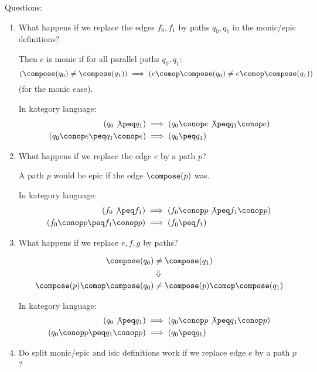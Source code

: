 \documentclass[11pt]{book}
\begin{document}
Questions:
\begin{enumerate}
  \item What happens if we replace the edges $f_0,f_1$
  by paths $q_0,q_1$ in the monic/epic definitions?
  
  Then $e$ is monic if for all parallel paths $q_0,q_1$:
  \[
  \left( \compose(q_0) \neq \compose(q_1) \right) 
  \implies 
  \left( e \comop \compose(q_0) \neq e \comop \compose(q_1) \right)
  \]
  (for the monic case).
  
  In kategory language:
  \begin{align*}
  \left( q_0 \not\peq q_1 \right) 
  & \implies 
  \left( q_0 \conop e \not\peq q_1 \conop e \right)
  \\
  \left( q_0 \conop e \peq q_1 \conop e \right)
  & \implies 
  \left( q_0 \peq q_1 \right) 
  \end{align*}

  \item What happens if we replace the edge $e$ by a path $p$?
  
  A path $p$ would be epic if the edge $\compose(p)$ was.
  
  In kategory language:
  \begin{align*}
  \left( f_0 \not\peq f_1 \right) 
  & \implies 
  \left( f_0 \conop p \not\peq f_1 \conop p \right)
  \\
  \left( f_0 \conop p \peq f_1 \conop p \right)
  & \implies 
  \left( f_0 \peq f_1 \right) 
  \end{align*}
  
  \item What happens if we replace $e,f,g$ by paths?
  
  \begin{align*}
  \compose(q_0) & \neq \compose(q_1) \\
  & \Downarrow \\
  \compose(p) \comop \compose(q_0) 
  & \neq \compose(p) \comop \compose(q_1) 
  \end{align*}
  
  In kategory language:
  \begin{align*}
  \left( q_0 \not\peq q_1 \right) 
  & \implies 
  \left( q_0 \conop p \not\peq q_1 \conop p \right)
  \\
  \left( q_0 \conop p \peq q_1 \conop p \right)
  & \implies 
  \left( q_0 \peq q_1 \right) 
  \end{align*}
  
  \item Do split monic/epic and isic definitions work if we replace
edge $e$ by a path $p$?
\end{enumerate}
\end{document}
